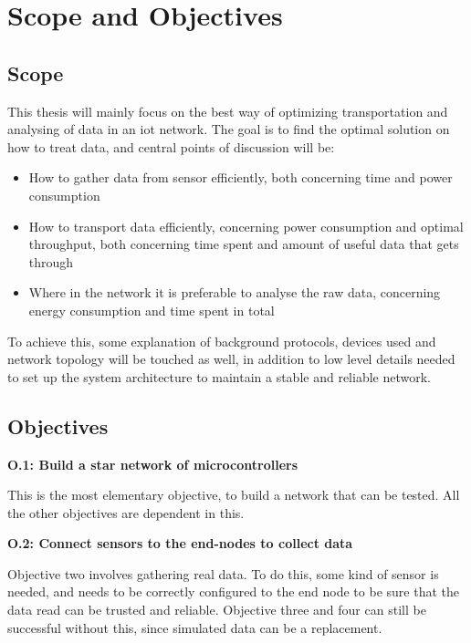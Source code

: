 \section{Scope and Objectives}

\subsection{Scope}

\noindent This thesis will mainly focus on the best way of optimizing transportation and analysing of data in an \gls{iot} network. The goal is to find the optimal solution on how to treat data, and central points of discussion will be:

\begin{itemize}
	\item How to gather data from sensor efficiently, both concerning time and power consumption
	\item How to transport data efficiently, concerning power consumption and optimal throughput, both concerning time spent and amount of useful data that gets through
	\item Where in the network it is preferable to analyse the raw data, concerning energy consumption and time spent in total
\end{itemize}

To achieve this, some explanation of background protocols, devices used and network topology will be touched as well, in addition to low level details needed to set up the system architecture to maintain a stable and reliable network. 


\subsection{Objectives}

\noindent \textbf{O.1: Build a star network of microcontrollers}

\noindent This is the most elementary objective, to build a network that can be tested. All the other objectives are dependent in this.  

\noindent\textbf{O.2: Connect sensors to the end-nodes to collect data}

\noindent Objective two involves gathering real data. To do this, some kind of sensor is needed, and needs to be correctly configured to the end node to be sure that the data read can be trusted and reliable. Objective three and four can still be successful without this, since simulated data can be a replacement.  


